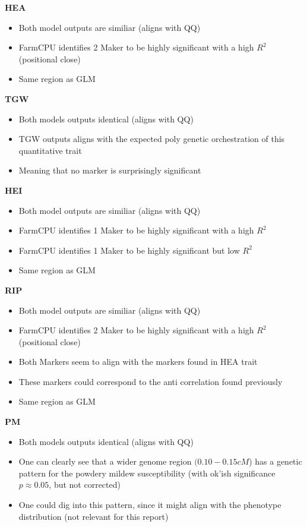 \documentclass{article}
\begin{document}
			\textbf{HEA}
			\begin{itemize}
				\item Both model outputs are similiar (aligns with QQ)
				\item FarmCPU identifies 2 Maker to be highly significant with a high $R^{2}$ (positional close)
				\item Same region as GLM
			\end{itemize}
			
			\textbf{TGW}
			\begin{itemize}
				\item Both models outputs identical (aligns with QQ)
				\item TGW outputs aligns with the expected poly genetic orchestration of this quantitative trait
				\item Meaning that no marker is surprisingly significant
			\end{itemize}
			
			\textbf{HEI}
			\begin{itemize}
				\item Both model outputs are similiar (aligns with QQ)
				\item FarmCPU identifies 1 Maker to be highly significant with a high $R^{2}$ 
				\item FarmCPU identifies 1 Maker to be highly significant but low $R^{2}$ 
				\item Same region as GLM
			\end{itemize}
			
			\textbf{RIP}
			\begin{itemize}
				\item Both model outputs are similiar (aligns with QQ)
				\item FarmCPU identifies 2 Maker to be highly significant with a high $R^{2}$ (positional close)
				\item Both Markers seem to align with the markers found in HEA trait
				\item These markers could correspond to the anti correlation found previously
				\item Same region as GLM
			\end{itemize}
			
			\textbf{PM}
			\begin{itemize}
				\item Both models outputs identical (aligns with QQ)
				\item One can clearly see that  a wider genome region $(0.10-0.15 cM$) has a genetic pattern for the powdery mildew susceptibility (with ok'ish significance $p\approx0.05$, but not corrected)
				\item One could dig into this pattern, since it might align with the phenotype distribution (not relevant for this report)
			\end{itemize}												
		
\end{document}
